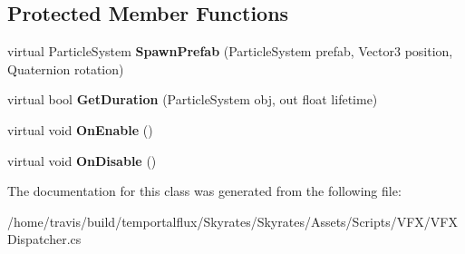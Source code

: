 \subsection*{Protected Member Functions}
\begin{DoxyCompactItemize}
\item 
\hypertarget{class_skyrates_1_1_effects_1_1_v_f_x_dispatcher_ae6d14c68c739675dd43be5698ea8cbc2}{virtual Particle\-System {\bfseries Spawn\-Prefab} (Particle\-System prefab, Vector3 position, Quaternion rotation)}\label{class_skyrates_1_1_effects_1_1_v_f_x_dispatcher_ae6d14c68c739675dd43be5698ea8cbc2}

\item 
\hypertarget{class_skyrates_1_1_effects_1_1_v_f_x_dispatcher_aee66a7a6e9f2e1d588a8e2f2c7aae454}{virtual bool {\bfseries Get\-Duration} (Particle\-System obj, out float lifetime)}\label{class_skyrates_1_1_effects_1_1_v_f_x_dispatcher_aee66a7a6e9f2e1d588a8e2f2c7aae454}

\item 
\hypertarget{class_skyrates_1_1_effects_1_1_v_f_x_dispatcher_ae387dcbb5f9498d6dfd4483aaf583b90}{virtual void {\bfseries On\-Enable} ()}\label{class_skyrates_1_1_effects_1_1_v_f_x_dispatcher_ae387dcbb5f9498d6dfd4483aaf583b90}

\item 
\hypertarget{class_skyrates_1_1_effects_1_1_v_f_x_dispatcher_a6d04f4ab523ab009cef08c04acb73e3d}{virtual void {\bfseries On\-Disable} ()}\label{class_skyrates_1_1_effects_1_1_v_f_x_dispatcher_a6d04f4ab523ab009cef08c04acb73e3d}

\end{DoxyCompactItemize}


The documentation for this class was generated from the following file\-:\begin{DoxyCompactItemize}
\item 
/home/travis/build/temportalflux/\-Skyrates/\-Skyrates/\-Assets/\-Scripts/\-V\-F\-X/V\-F\-X\-Dispatcher.\-cs\end{DoxyCompactItemize}
